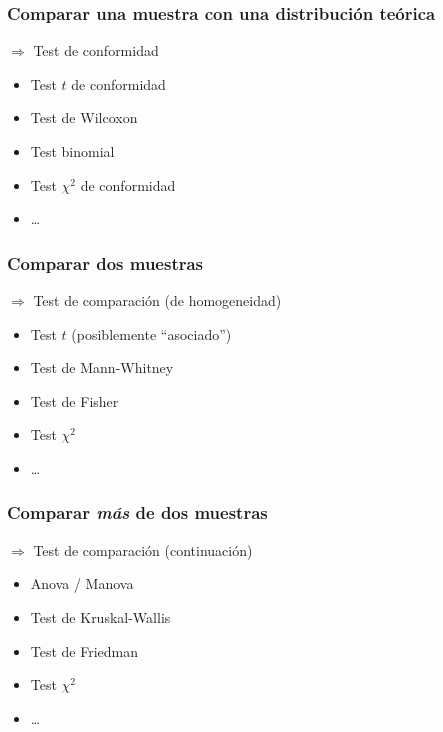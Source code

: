\documentclass[gray,handout,mathserif]{beamer}
\begin{document}
\begin{frame}[label=chtest3]
   \frametitle{Comparar una muestra con una distribuci\'on te\'orica }
   \begin{block}{\alert{$\Rightarrow$ Test de conformidad}}
   \begin{itemize}
      \item Test $t$ de conformidad
      \item Test de Wilcoxon
      \item Test binomial
      \item Test $\chi^2$ de conformidad
      \item \ldots
   \end{itemize}
   \end{block}
\end{frame}%

 
\begin{frame}[label=chtest4]
   \frametitle{Comparar dos muestras}
   \begin{block}{\alert{$\Rightarrow$ Test de comparaci\'on (de homogeneidad)}}
   \begin{itemize}
      \item Test $t$ (posiblemente ``asociado'')
      \item Test de Mann-Whitney
      \item Test de Fisher
      \item Test $\chi^2$
      \item \ldots
   \end{itemize}
   \end{block}
\end{frame}%


\begin{frame}[label=chtest5]
   \frametitle{Comparar \emph{m\'as} de dos muestras}
   \begin{block}{\alert{$\Rightarrow$ Test de comparaci\'on (continuaci\'on)}}
      \begin{itemize}
         \item Anova / Manova
         \item Test de Kruskal-Wallis
         \item Test de Friedman
         \item Test $\chi^2$
         \item \ldots
      \end{itemize}
   \end{block}
  \end{frame}%
\end{document}
